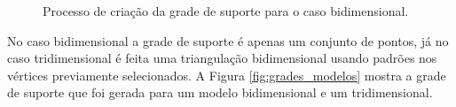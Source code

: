      \begin{figure}[!ht]
     	\centering
     	\qquad
     	\caption{Processo de criação da grade de suporte para o caso bidimensional.}
     	\label{fig:criacao_arestas}
     \end{figure}   

No caso bidimensional a grade de suporte é apenas um conjunto de pontos, já no caso tridimensional é feita uma triangulação bidimensional usando padrões nos vértices previamente selecionados. A Figura \ref{fig:grades_modelos} mostra a grade de suporte que foi gerada para um modelo bidimensional e um tridimensional.



